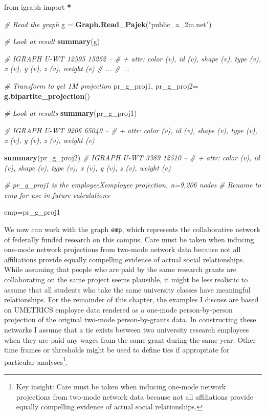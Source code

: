 \documentclass[]{krantz}
\newenvironment{Shaded}{\begin{snugshade}}{\end{snugshade}}
\newcommand{\KeywordTok}[1]{\textcolor[rgb]{0.13,0.29,0.53}{\textbf{#1}}}
\newcommand{\StringTok}[1]{\textcolor[rgb]{0.31,0.60,0.02}{#1}}
\newcommand{\CommentTok}[1]{\textcolor[rgb]{0.56,0.35,0.01}{\textit{#1}}}
\newcommand{\OperatorTok}[1]{\textcolor[rgb]{0.81,0.36,0.00}{\textbf{#1}}}
\newcommand{\NormalTok}[1]{#1}
\begin{document}
\begin{Shaded}
\begin{Highlighting}[]
\NormalTok{from igraph import }\OperatorTok{*}

\CommentTok{# Read the graph}
\NormalTok{g =}\StringTok{ }\KeywordTok{Graph.Read_Pajek}\NormalTok{(}\StringTok{"public_a_2m.net"}\NormalTok{)}

\CommentTok{# Look at result}
\KeywordTok{summary}\NormalTok{(g)}


\CommentTok{# IGRAPH U-WT 12595 15252 --}
\CommentTok{# + attr: color (v), id (v), shape (v), type (v), x (v), y (v), z (v), weight (e)}
\CommentTok{# ...}
\CommentTok{# ...}

\CommentTok{# Transform to get 1M projection}
\NormalTok{pr_g_proj1, pr_g_proj2=}\StringTok{ }\KeywordTok{g.bipartite_projection}\NormalTok{()}

\CommentTok{# Look at results}
\KeywordTok{summary}\NormalTok{(pr_g_proj1)}

\CommentTok{# IGRAPH U-WT 9206 65040 --}
\CommentTok{# + attr: color (v), id (v), shape (v), type (v), x (v), y (v), z (v), weight (e)}

\KeywordTok{summary}\NormalTok{(pr_g_proj2)}
\CommentTok{# IGRAPH U-WT 3389 12510 --}
\CommentTok{# + attr: color (v), id (v), shape (v), type (v), x (v), y (v), z (v), weight (e)}

\CommentTok{# pr_g_proj1 is the employeeXemployee projection, n=9,206 nodes}
\CommentTok{# Rename to emp for use in future calculations}

\NormalTok{emp=pr_g_proj1}
\end{Highlighting}
\end{Shaded}

\vspace*{12pt} We now can work with the graph \texttt{emp}, which
represents the collaborative network of federally funded research on
this campus. Care must be taken when inducing one-mode network
projections from two-mode network data because not all affiliations
provide equally compelling evidence of actual social relationships.
While assuming that people who are paid by the same research grants are
collaborating on the same project seems plausible, it might be less
realistic to assume that all students who take the same university
classes have meaningful relationships. For the remainder of this
chapter, the examples I discuss are based on UMETRICS employee data
rendered as a one-mode person-by-person projection of the original
two-mode person-by-grants data. In constructing these networks I assume
that a tie exists between two university research employees when they
are paid any wages from the same grant during the same year. Other time
frames or thresholds might be used to define ties if appropriate for
particular analyses\footnote{Key insight: Care must be taken when
  inducing one-mode network projections from two-mode network data
  because not all affiliations provide equally compelling evidence of
  actual social relationships.}.
\end{document}
